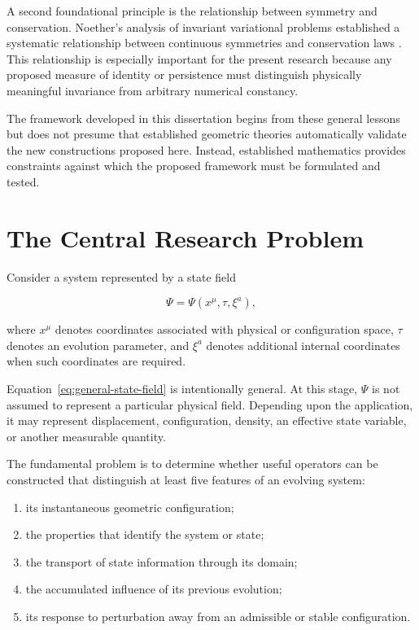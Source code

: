 \documentclass[12pt,oneside]{book}
\begin{document}
A second foundational principle is the relationship between
symmetry and conservation. Noether's analysis of invariant
variational problems established a systematic relationship
between continuous symmetries and conservation laws
\parencite{Noether1918}. This relationship is especially
important for the present research because any proposed measure
of identity or persistence must distinguish physically
meaningful invariance from arbitrary numerical constancy.

The framework developed in this dissertation begins from these
general lessons but does not presume that established geometric
theories automatically validate the new constructions proposed
here. Instead, established mathematics provides constraints
against which the proposed framework must be formulated and
tested.


\section{The Central Research Problem}
\label{sec:central-research-problem}

Consider a system represented by a state field

\begin{equation}
    \Psi = \Psi(x^\mu,\tau,\xi^a),
    \label{eq:general-state-field}
\end{equation}

where \(x^\mu\) denotes coordinates associated with physical or
configuration space, \(\tau\) denotes an evolution parameter,
and \(\xi^a\) denotes additional internal coordinates when such
coordinates are required.

Equation~\eqref{eq:general-state-field} is intentionally
general. At this stage, \(\Psi\) is not assumed to represent a
particular physical field. Depending upon the application, it
may represent displacement, configuration, density, an
effective state variable, or another measurable quantity.

The fundamental problem is to determine whether useful
operators can be constructed that distinguish at least five
features of an evolving system:

\begin{enumerate}[label=\arabic*.]
    \item its instantaneous geometric configuration;
    \item the properties that identify the system or state;
    \item the transport of state information through its domain;
    \item the accumulated influence of its previous evolution;
    \item its response to perturbation away from an admissible
    or stable configuration.
\end{enumerate}
\end{document}

